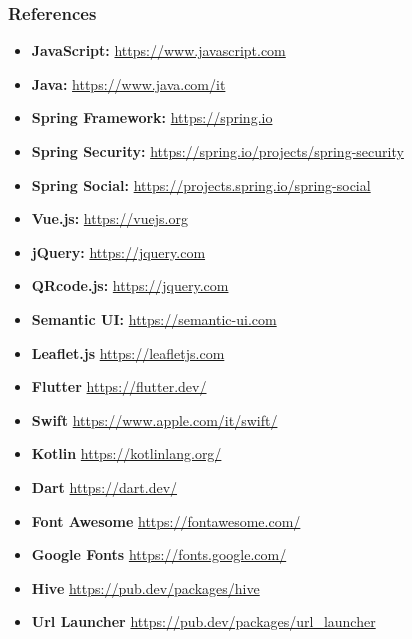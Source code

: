 \documentclass[table, 12pt]{article}
\begin{document}
\subsubsection{References}
\label{references}
\begin{itemize}
    \item \textbf{JavaScript: } \href{https://www.javascript.com}{https://www.javascript.com}
    \item \textbf{Java: } \href{https://www.java.com/it}{https://www.java.com/it}
    \item \textbf{Spring Framework: } \href{https://spring.io}{https://spring.io}
    \item \textbf{Spring Security: } \href{https://spring.io/projects/spring-security}{https://spring.io/projects/spring-security}
    \item \textbf{Spring Social: } \href{https://projects.spring.io/spring-social}{https://projects.spring.io/spring-social}
    \item \textbf{Vue.js: } \href{https://vuejs.org}{https://vuejs.org}
    \item \textbf{jQuery: } \href{https://jquery.com}{https://jquery.com}
    \item \textbf{QRcode.js: } \href{https://jquery.com}{https://jquery.com}
    \item \textbf{Semantic UI: } \href{https://semantic-ui.com}{https://semantic-ui.com}
    \item \textbf{Leaflet.js} \href{https://leafletjs.com}{https://leafletjs.com}
    \item \textbf{Flutter} \href{https://flutter.dev/}{https://flutter.dev/}
    \item \textbf{Swift} \href{https://www.apple.com/it/swift/}{https://www.apple.com/it/swift/}
    \item \textbf{Kotlin} \href{https://kotlinlang.org/}{https://kotlinlang.org/}
    \item \textbf{Dart} \href{https://dart.dev/}{https://dart.dev/}
    \item \textbf{Font Awesome} \href{https://fontawesome.com/}{https://fontawesome.com/}
    \item \textbf{Google Fonts} \href{https://fonts.google.com/}{https://fonts.google.com/}
    \item \textbf{Hive} \href{https://pub.dev/packages/hive}{https://pub.dev/packages/hive}
    \item \textbf{Url Launcher} \href{https://pub.dev/packages/url_launcher}{https://pub.dev/packages/url\_launcher}

\end{itemize}
\end{document}
